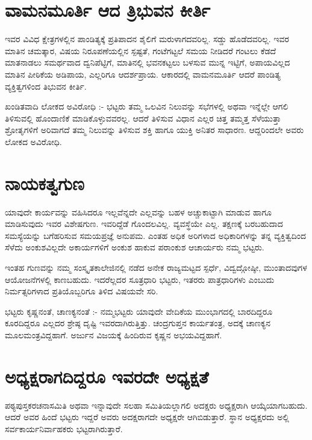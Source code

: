 \section*{ವಾಮನಮೂರ್ತಿ ಆದ ತ್ರಿಭುವನ ಕೀರ್ತಿ}  

ಇವರ ವಿವಿಧ ಕ್ಷೇತ್ರಗಳಲ್ಲಿನ  ಪಾಂಡಿತ್ಯಕ್ಕೆ ಪ್ರತಿಪಾದನ ಶೈಲಿಗೆ ಮರುಳಾಗದವರಿಲ್ಲ.  ಸಡ್ಡು ಹೊಡೆದವರಿಲ್ಲ.  ಇವರ ಮಾತಿನ ಚಮತ್ಕಾರ, ವಿಷಯ ನಿರೂಪಣೆಯಲ್ಲಿನ ಸ್ಪಷ್ಟತೆ, ಗಂಟೆಗಟ್ಟಲೆ ಸಮಯ ನೀಡಿದರೆ ಗಂಟಲು ಕೆಡದೆ ಮಾತನಾಡಲು ಸಮರ್ಥವಾದ ದ್ವನಿಪೆಟ್ಟಿಗೆ, ಮಾತಿನಲ್ಲಿ ಭವನಕಟ್ಟಲು ಬಳಸುವ ಮುನ್ನ ಇಟ್ಟಿಗೆ, ಅಪಾಯವಿಲ್ಲದ ಮಾತಿನ ಪೀಠಿಕೆಯ ಅಡಿಪಾಯ, ಎಲ್ಲರಿಗೂ ಆದರ್ಶಪ್ರಾಯ.  ಆಕಾರದಲ್ಲಿ ವಾಮನಮೂರ್ತಿ ಆದರೆ ಪಾಂಡಿತ್ಯ ವ್ಯಕ್ತಿತ್ವಗಳಿಂದ ತಿಭುವನ ಕೀರ್ತಿ.

ಖಂಡಿತವಾದಿ ಲೋಕದ ಅವಿರೋಧಿ :-  ಭಟ್ಟರು ತಮ್ಮ ಒಲವಿನ ನಿಲುವನ್ನು ಸಭೆಗಳಲ್ಲಿ ಅಥವಾ ಇನ್ನೆಲ್ಲೇ ಆಗಲಿ ತಿಳಿಸುವಲ್ಲಿ ಹೊಂದಾಣಿಕೆ ಮಾಡಿಕೊಳ್ಳುವವರಲ್ಲ.  ಆದರೆ ತಿಳಿಸುವ ವಿಧಾನ ಎಲ್ಲರ ಚಿತ್ತ ತಮ್ಮತ್ತ ಸೆಳೆಯುತ್ತಾ ಶ್ರೋತೃಗಳಿಗೆ ಅರಿವಾಗದೆ ತಮ್ಮ ನಿಲುವನ್ನು ತಿಳಿಸುವ ಶಕ್ತಿ ಹಾಗೂ ಯುಕ್ತಿ ಅನಿತರ ಸಾಧಾರಣ.  ಆದ್ದರಿಂದಲೇ ಅವರು ಲೋಕದ ಅವಿರೋಧಿ.

\section*{ನಾಯಕತ್ವಗುಣ} 

ಯಾವುದೇ ಕಾರ್ಯವನ್ನು ವಹಿಸಿದರೂ ಇಲ್ಲವೆನ್ನದೇ ಎಲ್ಲವನ್ನು ಬಹಳ ಅಚ್ಚುಕಾಟ್ಟಾಗಿ ಮಾಡುವ ಹಾಗೂ ಮಾಡಿಸುವುದು ಇವರ ವಿಶೇಷಗುಣ.  ಇವರಿದ್ದೆಡೆ ಗೊಂದಲವಿಲ್ಲ.  ವ್ಯವಸ್ಥೆಯೇ ಎಲ್ಲ.  ತಕ್ಷಣಕ್ಕೆ ಬರಬಹುದಾದ ಸಮಸ್ಯೆಯನ್ನು ಬಗೆಹರಿಸುವ ಸಮಯಪ್ರಜ್ಞೆ ಅನುಪಮ.  ಎಂತಹ ಅಧಿಕ ಅರಿಗಳಾದ ಅಧಿಕಾರಿಗಳನ್ನು ತನ್ನ ವ್ಯಕ್ತಿತ್ವದಿಂದ ಸೆಳೆದು ಅಂಕುಶವಿಲ್ಲದೇ ಅಕಾರ್ಯಗಳಿಗೆ ಅಂಕುಶ ಹಾಕುವ ಪರಾಂಕುಶ ಆಚಾರ್ಯರು ನಮ್ಮ ಭಟ್ಟರು.

ಇಂತಹ ಗುಣವನ್ನು ನಮ್ಮ ಸಂಸ್ಕೃತಕಾಲೇಜಿನಲ್ಲಿ ನಡೆದ ಅನೇಕ ರಾಜ್ಯಮಟ್ಟದ ಸ್ಪರ್ಧೆ, ವಿದ್ವದ್ಗೋಷ್ಠೀ, ಮುಂತಾದವುಗಳ ಆಯೋಜನೆಗಳಲ್ಲಿ ಕಾಣಬಹುದು.  ಇದರೆಲ್ಲದರ ಸೂತ್ರಧಾರಿ ಭಟ್ಟರು, ಇತರರು  ಪಾತ್ರಧಾರಿಗಳು ಎಂಬುದು ನಿರ್ಮತ್ಸರಿಗಳಾದ ಪ್ರತಿಯೊಬ್ಬರಿಗೂ ತಿಳಿದ ವಿಷಯವೇ ಸರಿ.

ಭಟ್ಟರು ಕೃಷ್ಣನಂತೆ, ಚಾಣಕ್ಯನಂತೆ :-  ನಮ್ಮಭಟ್ಟರು ಯಾವುದೇ ವೇದಿಕೆಯ ಮುಂಭಾಗದಲ್ಲಿ ಬಾರದಿದ್ದರೂ ಕೂರದಿದ್ದರೂ ಎಲ್ಲದರ ಶ್ರೇಷ್ಠ ದೃಷ್ಟಿ   ಇವರದಾಗಿರುತ್ತಿತ್ತು. ಚಂದ್ರಗುಪ್ತನ ಕಾರ್ಯತಂತ್ರ, ಅದಕ್ಕೆ ಚಾಣಕ್ಯನ ಮೂಲಮಂತ್ರವಿದ್ದಹಾಗೆ.  ಅರ್ಜುನ ವಿಜಯಕ್ಕೆ ಹಿಂದಿರುವ ಕೃಷ್ಣನ ಅಭಯವಿದ್ದಹಾಗೆ. 

\section*{ಅಧ್ಯಕ್ಷರಾಗದಿದ್ದರೂ ಇವರದೇ ಅಧ್ಯಕ್ಷತೆ} 

ಪಠ್ಯಪುಸ್ತಕರಚನಾಸಮಿತಿ ಅಥವಾ ಇನ್ನಾವುದೇ ಸಲಹಾ ಸಮಿತಿಯಲ್ಲಾಗಲಿ ಅದಕ್ಷರು ಅಧ್ಯಕ್ಷರಾಗಿ ಆಯ್ಕೆಯಾಗಬಹುದು.  ಆದರೆ ಅವರ ಹಿಂದೆ ಭಟ್ಟರು ಇದ್ದರೆ ಅವರು ಅದಕ್ಷರಾಗದೇ ಅಧ್ಯಕ್ಷರೇ ಆಗಿಬಿಡುತ್ತಾರೆ.  ಸ್ಥಾನ ಅಧ್ಯಕ್ಷರದು ಅಲ್ಲಿ ಸರ್ವಕಾರ್ಯನಿರ್ವಾಹಕರು ಭಟ್ಟರಾಗಿರುತ್ತಾರೆ.

